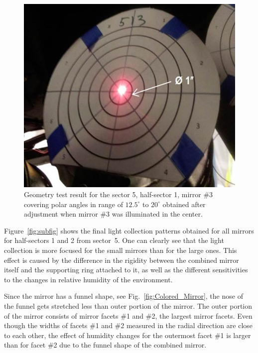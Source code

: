 \begin{figure}[ht]
    \centering
    \includegraphics[width=1.0\linewidth,trim={0 0cm 0 0},clip]{images/GEO_TEST_5_1_3_Center.jpg}
    \caption{Geometry test result for the sector 5, half-sector 1, mirror \#3 covering polar angles in range of
      $12.5^\circ$ to $20^\circ$ obtained after adjustment when mirror \#3 was illuminated in the center.}
    \label{fig:GEO_TEST_5_1_3_Center}
\end{figure}

Figure~\ref{fig:subfig} shows the final light collection patterns obtained for all mirrors for half-sectors 1 and
2 from sector~5. One can clearly see that the light collection is more focused for the small mirrors than for the
large ones. This effect is caused by the difference in the rigidity between the combined mirror itself and the
supporting ring attached to it, as well as the different sensitivities to the changes in relative humidity of the
environment.
 
Since the mirror has a funnel shape, see Fig.~\ref{fig:Colored_Mirror}, the nose of the funnel gets stretched
less than outer portion of the mirror. The outer portion of the mirror consists of mirror facets \#1 and \#2, the
largest mirror facets. Even though the widths of facets \#1 and \#2 measured in the radial direction are close to
each other, the effect of humidity changes for the outermost facet \#1 is larger than for facet \#2 due to the
funnel shape of the combined mirror.


